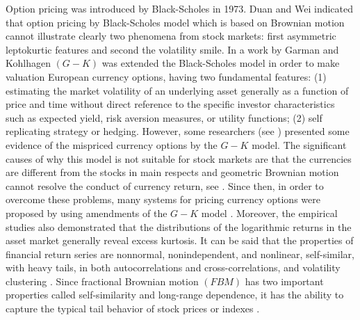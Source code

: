 \documentclass[a4paper,11pt]{amsart}
\numberwithin{equation}{section}
\theoremstyle{definition}
\theoremstyle{plain}
\theoremstyle{definition}
\newcommand{\1}{\mathbf{1}}
\begin{document}
Option pricing was introduced by Black-Scholes \cite{black} in 1973. Duan
and Wei \cite{duan1999pricing} indicated that option pricing by Black-Scholes
model which is based on Brownian motion cannot illustrate
clearly two phenomena from stock markets: first asymmetric
leptokurtic features and second the volatility smile. In a
work by Garman and Kohlhagen $(G-K)$ \cite{garman1983foreign} was
extended the Black-Scholes model in order to make valuation
European currency options, having two fundamental features:
(1) estimating the market volatility of an underlying asset
generally as a function of price and time without direct reference
to the specific investor characteristics such as expected yield, risk aversion measures, or utility functions; (2) self replicating
strategy or hedging. However, some researchers
(see \cite{cookson1992models}) presented some evidence of the mispriced currency
options by the $G-K$ model. The significant causes of why
this model is not suitable for stock markets are that the
currencies are different from the stocks in main respects and
geometric Brownian motion cannot resolve the conduct of
currency return, see \cite{ekvall1997currency}. Since then, in order to overcome
these problems, many systems for pricing currency options
were proposed by using amendments of the $G-K$ model \cite{rosenberg1998pricing,sarwar2000empirical,bollen2003performance}. Moreover, the empirical studies
also demonstrated that the distributions of the logarithmic
returns in the asset market generally reveal excess kurtosis.
It can be said that the properties of
financial return series are nonnormal, nonindependent, and
nonlinear, self-similar, with heavy tails, in both autocorrelations
and cross-correlations, and volatility clustering \cite{huang1995fractal,cajueiro2007long,ding1993long,podobnik2008detrended}. Since fractional Brownian motion $(FBM)$ has two important
properties called self-similarity and long-range dependence, it has the
ability to capture the typical tail behavior of stock prices or indexes \cite{wang2010scaling,wang2010scaling0,shokrollahi1,shokrollahi5,shokrollahi4}.
\end{document}
